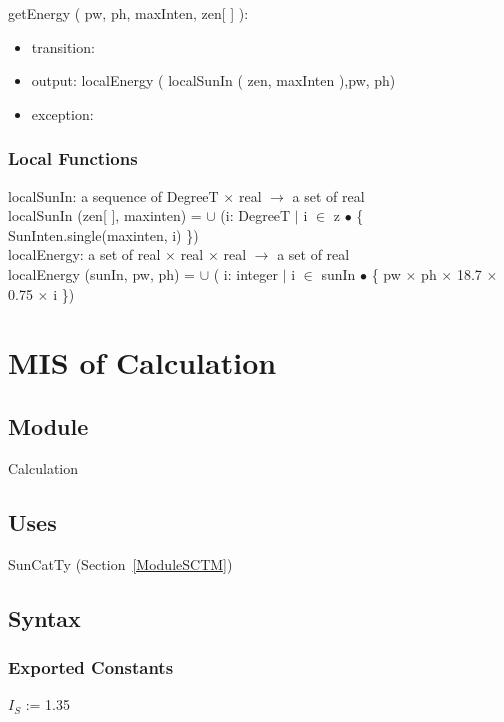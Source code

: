 \documentclass[12pt, titlepage]{article}
\begin{document}
\noindent  getEnergy ( pw, ph, maxInten, zen[ ] ):
\begin{itemize}
\item transition:
\item output:  localEnergy ( localSunIn ( zen, maxInten ),pw, ph)
\item exception: 
\end{itemize}


\subsubsection{Local Functions}
localSunIn: a sequence of DegreeT $\times$ real $\rightarrow$ a set of real\\
localSunIn (zen[ ], maxinten) = $\cup$ (i: DegreeT $|$ i $\in$ z $\bullet$ \{ SunInten.single(maxinten, i) \})\\

localEnergy: a set of real $\times$ real $\times$ real $\rightarrow$ a set of real\\
localEnergy (sunIn, pw, ph) =  $\cup$ ( i: integer $|$ i $\in$ sunIn $\bullet$ \{ pw $\times$ ph $\times$ 18.7 $\times$ 0.75 $\times$ i \})



\newpage


\section{MIS of Calculation} \label{ModuleC} 

\subsection{Module}
Calculation\\


\subsection{Uses}
SunCatTy (Section~\ref{ModuleSCTM}) \\


\subsection{Syntax}

\subsubsection{Exported Constants}
$I_{S}$ := 1.35\\
\end{document}
